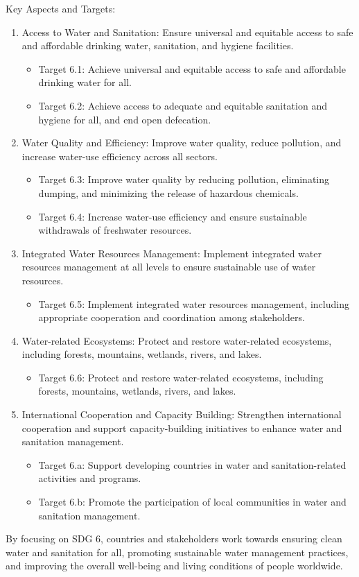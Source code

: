 \documentclass{article}
\begin{document}
Key Aspects and Targets:
\begin{enumerate}
    \item Access to Water and Sanitation: Ensure universal and equitable access to safe and affordable drinking water, sanitation, and hygiene facilities.
    \begin{itemize}
        \item Target 6.1: Achieve universal and equitable access to safe and affordable drinking water for all.
        \item Target 6.2: Achieve access to adequate and equitable sanitation and hygiene for all, and end open defecation.
    \end{itemize}
    \item Water Quality and Efficiency: Improve water quality, reduce pollution, and increase water-use efficiency across all sectors.
    \begin{itemize}
        \item Target 6.3: Improve water quality by reducing pollution, eliminating dumping, and minimizing the release of hazardous chemicals.
        \item Target 6.4: Increase water-use efficiency and ensure sustainable withdrawals of freshwater resources.
    \end{itemize}
    \item Integrated Water Resources Management: Implement integrated water resources management at all levels to ensure sustainable use of water resources.
    \begin{itemize}
        \item Target 6.5: Implement integrated water resources management, including appropriate cooperation and coordination among stakeholders.
    \end{itemize}
    \item Water-related Ecosystems: Protect and restore water-related ecosystems, including forests, mountains, wetlands, rivers, and lakes.
    \begin{itemize}
        \item Target 6.6: Protect and restore water-related ecosystems, including forests, mountains, wetlands, rivers, and lakes.
    \end{itemize}
    \item International Cooperation and Capacity Building: Strengthen international cooperation and support capacity-building initiatives to enhance water and sanitation management.
    \begin{itemize}
        \item Target 6.a: Support developing countries in water and sanitation-related activities and programs.
        \item Target 6.b: Promote the participation of local communities in water and sanitation management.
    \end{itemize}
\end{enumerate}
By focusing on SDG 6, countries and stakeholders work towards ensuring clean water and sanitation for all, promoting sustainable water management practices, and improving the overall well-being and living conditions of people worldwide.
\end{document}
